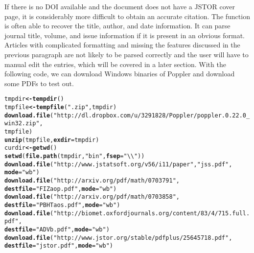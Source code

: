 \documentclass[article]{jss}\usepackage[]{graphicx}\usepackage[]{color}
\makeatletter
\newcommand{\hlstr}[1]{\textcolor[rgb]{0.125,0.125,1}{#1}}%
\newcommand{\hlstd}[1]{\textcolor[rgb]{0.251,0.251,0.282}{#1}}%
\newcommand{\hlkwb}[1]{\textcolor[rgb]{0.439,0.251,1}{\textbf{#1}}}%
\newcommand{\hlkwc}[1]{\textcolor[rgb]{0.529,0,0.184}{\textbf{#1}}}%
\newcommand{\hlkwd}[1]{\textcolor[rgb]{0.251,0.251,0.282}{\textbf{#1}}}%
\newenvironment{kframe}{%
 \def\at@end@of@kframe{}%
 \ifinner\ifhmode%
  \def\at@end@of@kframe{\end{minipage}}%
  \begin{minipage}{\columnwidth}%
 \fi\fi%
 \def\FrameCommand##1{\hskip\@totalleftmargin \hskip-\fboxsep
 \colorbox{shadecolor}{##1}\hskip-\fboxsep
     \hskip-\linewidth \hskip-\@totalleftmargin \hskip\columnwidth}%
 \MakeFramed {\advance\hsize-\width
   \@totalleftmargin\z@ \linewidth\hsize
   \@setminipage}}%
 {\par\unskip\endMakeFramed%
 \at@end@of@kframe}
\newenvironment{knitrout}{}{} %
\makeatother
\begin{document}
If there is no DOI available and the document does not have a JSTOR cover page, it is considerably more difficult to obtain an accurate citation.  The function is often able to recover the title, author, and date information.  It can parse journal title, volume, and issue information if it is present in an obvious format.  Articles with complicated formatting and missing the features discussed in the previous paragraph are not likely to be parsed correctly and the user will have to manual edit the entries, which will be covered in a later section.
With the following code, we can download Windows binaries of Poppler and download some PDFs
to test out.
\begin{knitrout}
\color{fgcolor}\begin{kframe}
\begin{alltt}
\hlstd{tmpdir} \hlkwb{<-} \hlkwd{tempdir}\hlstd{()}
\hlstd{tmpfile} \hlkwb{<-} \hlkwd{tempfile}\hlstd{(}\hlstr{".zip"}\hlstd{, tmpdir)}
\hlkwd{download.file}\hlstd{(}\hlstr{"http://dl.dropbox.com/u/3291828/Poppler/poppler.0.22.0_win32.zip"}\hlstd{,}
              \hlstd{tmpfile)}
\hlkwd{unzip}\hlstd{(tmpfile,} \hlkwc{exdir} \hlstd{= tmpdir)}
\hlstd{curdir} \hlkwb{<-} \hlkwd{getwd}\hlstd{()}
\hlkwd{setwd}\hlstd{(}\hlkwd{file.path}\hlstd{(tmpdir,} \hlstr{"bin"}\hlstd{,} \hlkwc{fsep} \hlstd{=} \hlstr{"\textbackslash{}\textbackslash{}"}\hlstd{))}
\hlkwd{download.file}\hlstd{(}\hlstr{"http://www.jstatsoft.org/v56/i11/paper"}\hlstd{,} \hlstr{"jss.pdf"}\hlstd{,}
                \hlkwc{mode} \hlstd{=} \hlstr{"wb"}\hlstd{)}
\hlkwd{download.file}\hlstd{(}\hlstr{"http://arxiv.org/pdf/math/0703791"}\hlstd{,}
              \hlkwc{destfile} \hlstd{=} \hlstr{"FIZaop.pdf"}\hlstd{,} \hlkwc{mode} \hlstd{=} \hlstr{"wb"}\hlstd{)}
\hlkwd{download.file}\hlstd{(}\hlstr{"http://arxiv.org/pdf/math/0703858"}\hlstd{,}
              \hlkwc{destfile} \hlstd{=} \hlstr{"PBHTaos.pdf"}\hlstd{,} \hlkwc{mode} \hlstd{=} \hlstr{"wb"}\hlstd{)}
\hlkwd{download.file}\hlstd{(}\hlstr{"http://biomet.oxfordjournals.org/content/83/4/715.full.pdf"}\hlstd{,}
  \hlkwc{destfile} \hlstd{=} \hlstr{"ADVb.pdf"}\hlstd{,} \hlkwc{mode} \hlstd{=} \hlstr{"wb"}\hlstd{)}
\hlkwd{download.file}\hlstd{(}\hlstr{"http://www.jstor.org/stable/pdfplus/25645718.pdf"}\hlstd{,}
              \hlkwc{destfile} \hlstd{=} \hlstr{"jstor.pdf"}\hlstd{,} \hlkwc{mode} \hlstd{=} \hlstr{"wb"}\hlstd{)}
\end{alltt}
\end{kframe}
\end{knitrout}
\end{document}

